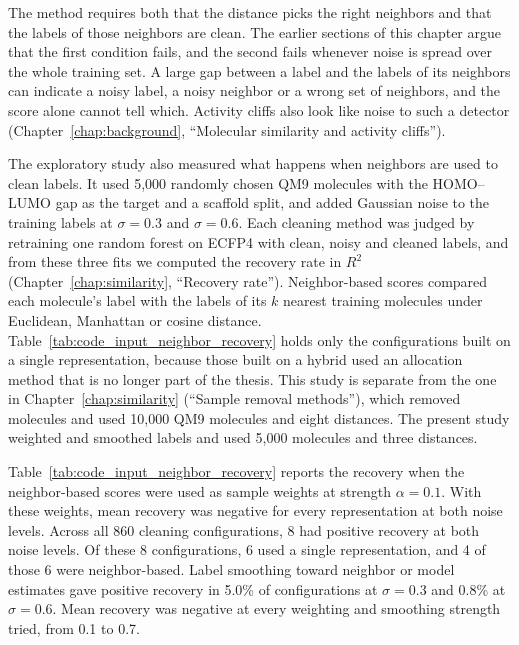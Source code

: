 The method requires both that the distance picks the right neighbors and that the labels of those neighbors are clean. The earlier sections of this chapter argue that the first condition fails, and the second fails whenever noise is spread over the whole training set. A large gap between a label and the labels of its neighbors can indicate a noisy label, a noisy neighbor or a wrong set of neighbors, and the score alone cannot tell which. Activity cliffs also look like noise to such a detector (Chapter~\ref{chap:background}, ``Molecular similarity and activity cliffs'').

The exploratory study also measured what happens when neighbors are used to clean labels. It used 5,000 randomly chosen QM9 molecules with the HOMO--LUMO gap as the target and a scaffold split, and added Gaussian noise to the training labels at $\sigma = 0.3$ and $\sigma = 0.6$. Each cleaning method was judged by retraining one random forest on ECFP4 with clean, noisy and cleaned labels, and from these three fits we computed the recovery rate in $R^2$ (Chapter~\ref{chap:similarity}, ``Recovery rate''). Neighbor-based scores compared each molecule's label with the labels of its $k$ nearest training molecules under Euclidean, Manhattan or cosine distance. Table~\ref{tab:code_input_neighbor_recovery} holds only the configurations built on a single representation, because those built on a hybrid used an allocation method that is no longer part of the thesis. This study is separate from the one in Chapter~\ref{chap:similarity} (``Sample removal methods''), which removed molecules and used 10,000 QM9 molecules and eight distances. The present study weighted and smoothed labels and used 5,000 molecules and three distances.

Table~\ref{tab:code_input_neighbor_recovery} reports the recovery when the neighbor-based scores were used as sample weights at strength $\alpha = 0.1$. With these weights, mean recovery was negative for every representation at both noise levels. Across all 860 cleaning configurations, 8 had positive recovery at both noise levels. Of these 8 configurations, 6 used a single representation, and 4 of those 6 were neighbor-based. Label smoothing toward neighbor or model estimates gave positive recovery in 5.0\% of configurations at $\sigma = 0.3$ and 0.8\% at $\sigma = 0.6$. Mean recovery was negative at every weighting and smoothing strength tried, from 0.1 to 0.7.

